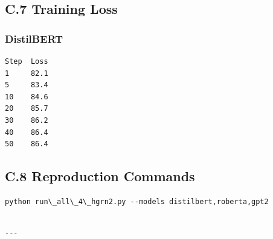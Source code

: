 \subsection{C.7 Training Loss}

\subsubsection{DistilBERT}
\begin{lstlisting}
Step  Loss
1     82.1
5     83.4
10    84.6
20    85.7
30    86.2
40    86.4
50    86.4
\end{lstlisting}

\subsection{C.8 Reproduction Commands}

\begin{lstlisting}
python run\_all\_4\_hgrn2.py --models distilbert,roberta,gpt2
\end{lstlisting}
\begin{lstlisting}

---
\end{lstlisting}
